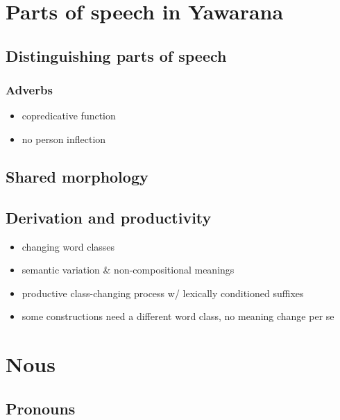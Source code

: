 \documentclass{memoir}
\begin{document}
\chapter{\texorpdfstring{Parts of speech in Yawarana
\label{POS}}{Parts of speech in Yawarana }}

\section{Distinguishing parts of speech}

\subsection{Adverbs}

\begin{itemize}
\tightlist
\item
  copredicative function
\item
  no person inflection
\end{itemize}

\section{Shared morphology}

\section{Derivation and productivity}

\begin{itemize}
\tightlist
\item
  changing word classes
\item
  semantic variation \& non-compositional meanings
\item
  productive class-changing process w/ lexically conditioned suffixes
\item
  some constructions need a different word class, no meaning change per
  se
\end{itemize}

\chapter{\texorpdfstring{Nous \label{nouns}}{Nous }}

\section{\texorpdfstring{Pronouns \label{sec:pronouns}}{Pronouns }}
\end{document}

